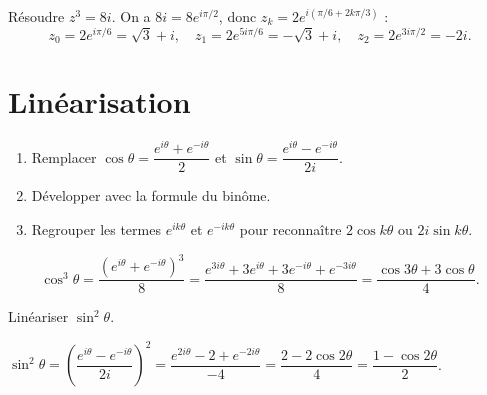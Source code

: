\begin{exemple}
Résoudre $z^3=8i$. On a $8i=8e^{i\pi/2}$, donc $z_k=2e^{i(\pi/6+2k\pi/3)}$ :
\[
  z_0=2e^{i\pi/6}=\sqrt3+i,\quad z_1=2e^{5i\pi/6}=-\sqrt3+i,\quad z_2=2e^{3i\pi/2}=-2i .
\]
\end{exemple}

\section{Linéarisation}

\begin{methode}
\begin{enumerate}[label=\textbf{Étape \arabic*.}]
  \item Remplacer $\cos\theta=\dfrac{e^{i\theta}+e^{-i\theta}}2$ et $\sin\theta=\dfrac{e^{i\theta}-e^{-i\theta}}{2i}$.
  \item Développer avec la formule du binôme.
  \item Regrouper les termes $e^{ik\theta}$ et $e^{-ik\theta}$ pour reconnaître $2\cos k\theta$ ou $2i\sin k\theta$.
\end{enumerate}
\end{methode}

\begin{exemple}
\[
  \cos^3\theta=\frac{(e^{i\theta}+e^{-i\theta})^3}{8}
  =\frac{e^{3i\theta}+3e^{i\theta}+3e^{-i\theta}+e^{-3i\theta}}{8}
  =\frac{\cos3\theta+3\cos\theta}{4}.
\]
\end{exemple}

\begin{exercice}[Application]
Linéariser $\sin^2\theta$.
\begin{correction}
$\sin^2\theta=\left(\dfrac{e^{i\theta}-e^{-i\theta}}{2i}\right)^2=\dfrac{e^{2i\theta}-2+e^{-2i\theta}}{-4}=\dfrac{2-2\cos2\theta}{4}=\dfrac{1-\cos2\theta}{2}$.
\end{correction}
\end{exercice}
